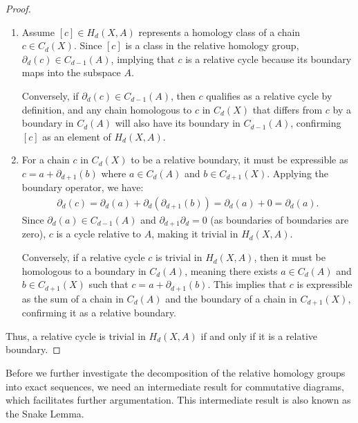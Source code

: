 \begin{proof}
\begin{enumerate}
    \item Assume \([c] \in H_{d}(X, A)\) represents a homology class of a chain \( c \in C_{d}(X) \). Since \([c]\) is a class in the relative homology group, \( \partial_{d}(c) \in C_{d-1}(A) \), implying that \( c \) is a relative cycle because its boundary maps into the subspace \( A \).

    Conversely, if \( \partial_{d}(c) \in C_{d-1}(A) \), then \( c \) qualifies as a relative cycle by definition, and any chain homologous to \( c \) in \( C_{d}(X) \) that differs from \( c \) by a boundary in \( C_{d}(A) \) will also have its boundary in \( C_{d-1}(A) \), confirming \([c]\) as an element of \( H_{d}(X, A) \).

    \item For a chain \( c \) in \( C_{d}(X) \) to be a relative boundary, it must be expressible as \( c = a + \partial_{d+1}(b) \) where \( a \in C_{d}(A) \) and \( b \in C_{d+1}(X) \). Applying the boundary operator, we have:
    \begin{align}
    \partial_{d}(c) = \partial_{d}(a) + \partial_{d}(\partial_{d+1}(b)) = \partial_{d}(a) + 0 = \partial_{d}(a).
    \end{align}
    Since \( \partial_{d}(a) \in C_{d-1}(A) \) and \( \partial_{d+1}\partial_{d} = 0 \) (as boundaries of boundaries are zero), \( c \) is a cycle relative to \( A \), making it trivial in \( H_{d}(X, A) \).

    Conversely, if a relative cycle \( c \) is trivial in \( H_{d}(X, A) \), then it must be homologous to a boundary in \( C_{d}(A) \), meaning there exists \( a \in C_{d}(A) \) and \( b \in C_{d+1}(X) \) such that \( c = a + \partial_{d+1}(b) \). This implies that \( c \) is expressible as the sum of a chain in \( C_{d}(A) \) and the boundary of a chain in \( C_{d+1}(X) \), confirming it as a relative boundary.
\end{enumerate}
Thus, a relative cycle is trivial in \( H_{d}(X, A) \) if and only if it is a relative boundary.
\end{proof}

Before we further investigate the decomposition of the relative homology groups into exact sequences, we need an intermediate result for commutative diagrams, which facilitates further argumentation. This intermediate result is also known as the Snake Lemma.

